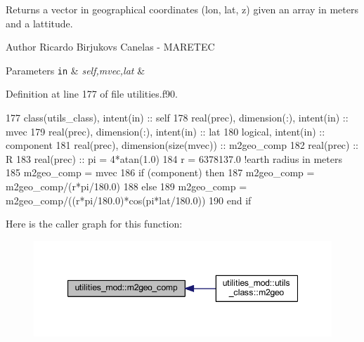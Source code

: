 Returns a vector in geographical coordinates (lon, lat, z) given an array in meters and a lattitude. 

\begin{DoxyAuthor}{Author}
Ricardo Birjukovs Canelas -\/ M\+A\+R\+E\+T\+EC 
\end{DoxyAuthor}

\begin{DoxyParams}[1]{Parameters}
\mbox{\tt in}  & {\em self,mvec,lat} & \\
\hline
\end{DoxyParams}


Definition at line 177 of file utilities.\+f90.


\begin{DoxyCode}
177     \textcolor{keywordtype}{class}(utils\_class), \textcolor{keywordtype}{intent(in)} :: self
178     \textcolor{keywordtype}{real(prec)}, \textcolor{keywordtype}{dimension(:)}, \textcolor{keywordtype}{intent(in)} :: mvec
179     \textcolor{keywordtype}{real(prec)}, \textcolor{keywordtype}{dimension(:)}, \textcolor{keywordtype}{intent(in)} :: lat
180     \textcolor{keywordtype}{logical}, \textcolor{keywordtype}{intent(in)} :: component
181     \textcolor{keywordtype}{real(prec)}, \textcolor{keywordtype}{dimension(size(mvec))} :: m2geo\_comp
182     \textcolor{keywordtype}{real(prec)} :: R
183     \textcolor{keywordtype}{real(prec)} :: pi = 4*atan(1.0)
184     r = 6378137.0 \textcolor{comment}{!earth radius in meters}
185     m2geo\_comp = mvec
186     \textcolor{keywordflow}{if} (component) \textcolor{keywordflow}{then}
187         m2geo\_comp = m2geo\_comp/(r*pi/180.0)
188     \textcolor{keywordflow}{else}
189         m2geo\_comp = m2geo\_comp/((r*pi/180.0)*cos(pi*lat/180.0))
190 \textcolor{keywordflow}{    end if}
\end{DoxyCode}
Here is the caller graph for this function\+:\nopagebreak
\begin{figure}[H]
\begin{center}
\leavevmode
\includegraphics[width=347pt]{namespaceutilities__mod_ae6b8a45b229e3f1f8c2b12dd74e7a2dd_icgraph}
\end{center}
\end{figure}
\mbox{\label{namespaceutilities__mod_a70b21b18c8633b7fd4c3057530d3f16f}} 
